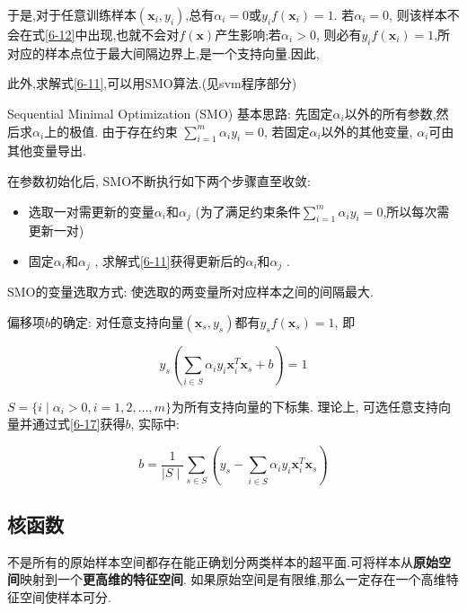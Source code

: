 \documentclass[12pt]{article}
\numberwithin{equation}{section}%
\begin{document}
于是,对于任意训练样本$(\boldsymbol{x}_{i},y_{i})$,总有$\alpha_{i}=0$或$y_{i}f(\boldsymbol{x}_{i}) =1$. 若$\alpha_{i}=0$, 则该样本不会在式\ref{6-12}中出现,也就不会对$f(\boldsymbol{x})$产生影响;若$\alpha_{i} > 0$, 则必有$y_{i}f(\boldsymbol{x}_{i})=1$,所对应的样本点位于最大间隔边界上,是一个支持向量.因此,{\color{red}{训练完成后,大部分的训练样本都不需要保留,最终模型仅与支持向量有关.}}

此外,{\color{blue}求解式\ref{6-11},可以用SMO算法.}(见svm程序部分)

Sequential Minimal Optimization (SMO) 基本思路: 先固定$\alpha_{i}$以外的所有参数,然后求$\alpha_{i}$上的极值. 由于存在约束 $ \sum_{i=1}^{m}\alpha_{i}y_{i} = 0$, 若固定$\alpha_{i}$以外的其他变量, $\alpha_{i}$可由其他变量导出.

在参数初始化后, SMO不断执行如下两个步骤直至收敛:

\begin{itemize}
\item 选取一对需更新的变量$\alpha_{i}$和$\alpha_{j}$ (为了满足约束条件$ \sum_{i=1}^{m}\alpha_{i}y_{i} = 0$,所以每次需更新一对)

\item 固定$\alpha_{i}$和$\alpha_{j}$ , 求解式\ref{6-11}获得更新后的$\alpha_{i}$和$\alpha_{j}$ .
\end{itemize}

SMO的变量选取方式: 使选取的两变量所对应样本之间的间隔最大.

偏移项$b$的确定: 对任意支持向量$(\boldsymbol{x}_{s},y_{s})$都有$y_{s}f(\boldsymbol{x}_{s})=1$, 即

\begin{equation}
y_{s}(\sum_{i \in S}\alpha_{i}y_{i}\boldsymbol{x}_{i}^{T}\boldsymbol{x}_{s}+b)=1
\label{6-17}
\end{equation}

$S=\{i\mid \alpha_{i} > 0, i=1, 2, \ldots, m\}$为所有支持向量的下标集. 理论上, 可选任意支持向量并通过式\ref{6-17}获得$b$, 实际中:

\begin{equation}
b=\frac{1}{\mid S\mid}\sum_{s\in S}(y_{s}-\sum_{i \in S}\alpha_{i}y_{i}\boldsymbol{x}_{i}^{T}\boldsymbol{x}_{s})
\end{equation}



\subsection{核函数}

不是所有的原始样本空间都存在能正确划分两类样本的超平面.可将样本从\textbf{原始空间}映射到一个\textbf{更高维的特征空间}. 如果原始空间是有限维,那么一定存在一个高维特征空间使样本可分.
\end{document}
